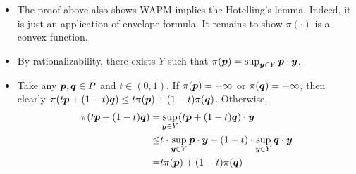 {\begin{enumerate}
  \begin{itemize}
  \item
    The proof above also shows WAPM implies the
    Hotelling's lemma. Indeed, it is just an application
    of envelope formula. It remains to show \(\pi(\cdot)\) is a convex
    function.
  \item
    By rationalizability, there exists \(Y\) such that
    \(\pi(\bm p) = \sup_{\bm y\in Y} \bm p\cdot\bm y\).
  \item
    Take any \(\bm p,\bm q\in P\) and \(t\in (0,1)\). If \(\pi(\bm p) = +\infty\)
    or \(\pi(\bm q) = +\infty\), then clearly
    \(\pi(t\bm p + (1-t)\bm q)\le t\pi(\bm p)+ (1-t)\pi(\bm q)\). Otherwise,
    $$
\begin{aligned}
    \pi(t\bm p + (1-t)\bm q) = & \sup_{\bm y\in Y} (t\bm p + (1-t)\bm q)\cdot \bm y\\
     \le & t\cdot \sup_{\bm y\in Y}\bm p\cdot \bm y + (1-t)\cdot \sup_{\bm y\in Y}\bm q\cdot \bm y\\
     = & t\pi(\bm p)+ (1-t)\pi(\bm q)
    \end{aligned}
$$
  \end{itemize}
\end{enumerate}
}

